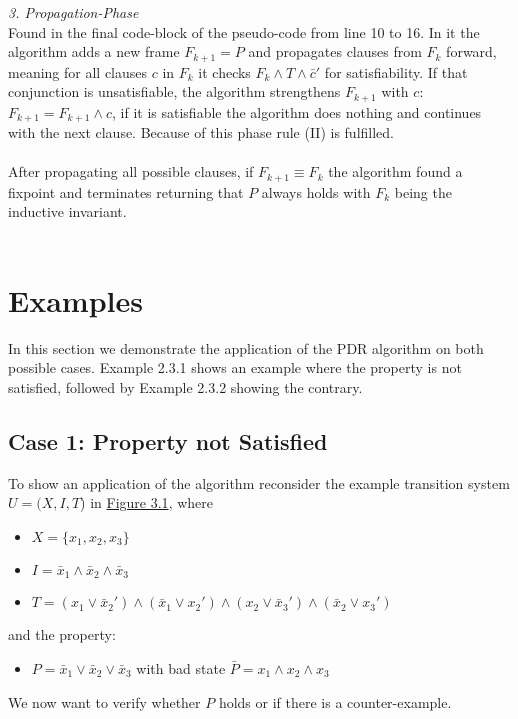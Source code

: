 \documentclass[11pt, a4paper, BCOR=10mm, ngerman]{scrbook}
\begin{document}
\textsl{3. Propagation-Phase}\\ Found in the final code-block of the pseudo-code from line 10 to 16. In it the algorithm adds a new frame $F_{k + 1} = P$ and propagates clauses from $F_{k}$ forward, meaning for all clauses $c$ in $F_{k}$ it checks $F_{k} \land T \land \bar c'$ for satisfiability. If that conjunction is unsatisfiable, the algorithm strengthens $F_{k+1}$ with $c$: $F_{k+1} = F_{k+1} \land c$, if it is satisfiable the algorithm does nothing and continues with the next clause. Because of this phase rule (II) is fulfilled.\\ \\
After propagating all possible clauses, if $F_{k+1} \equiv F_{k}$ the algorithm found a fixpoint and terminates returning that $P$ always holds with $F_k$ being the inductive invariant. \\ \\

\pagebreak

\section{Examples}

In this section we demonstrate the application of the PDR algorithm on both possible cases. Example 2.3.1 shows an example where the property is not satisfied, followed by Example 2.3.2 showing the contrary.
 
\subsection{Case 1: Property not Satisfied} 
To show an application of the algorithm reconsider the example transition system $U = (X, I, T$) in \hyperref[ex1]{Figure 3.1}, where \par
\begin{itemize}
\item $X = \{x_1, x_2, x_3\}$
\item $I = \bar x_1 \land \bar x_2 \land \bar x_3$
\item $T = (x_1 \lor \bar x_2' ) \land ( \bar x_1 \lor x_2') \land (x_2 \lor \bar x_3') \land ( \bar x_2 \lor x_3')$
\end{itemize}
and the property: 
\begin{itemize}
\item $P = \bar x_1 \lor \bar x_2 \lor \bar x_3$ with bad state $\bar P = x_1 \land x_2 \land x_3$ 
\end{itemize}
We now want to verify whether $P$ holds or if there is a counter-example. \\ \\
\end{document}
